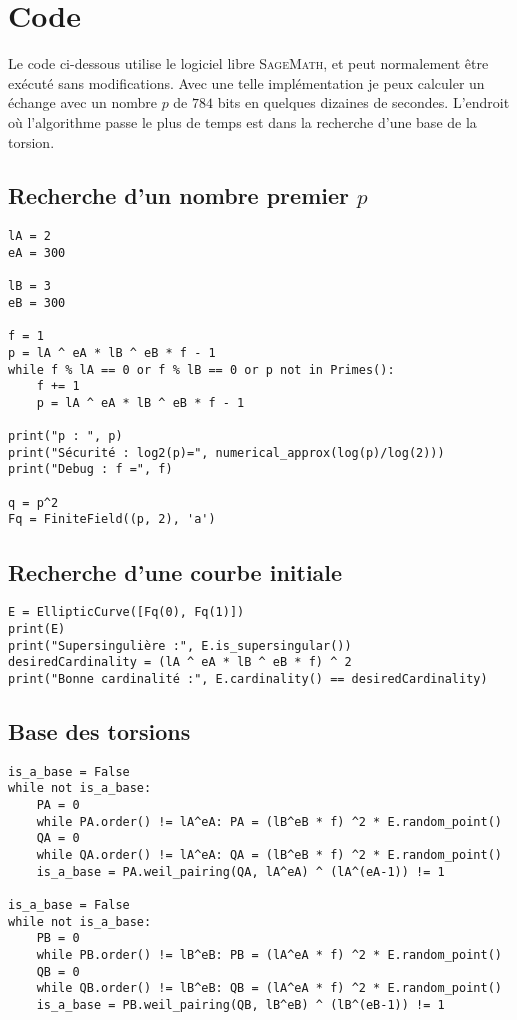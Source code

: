 \documentclass{article}
\theoremstyle{plain}%
\theoremstyle{definition}%
\begin{document}



\appendix

\section{Code}

Le code ci-dessous utilise le logiciel libre \textsc{SageMath}, et peut normalement être exécuté sans modifications. Avec une telle implémentation je peux calculer un échange avec un nombre $p$ de $784$ bits en quelques dizaines de secondes. L'endroit où l'algorithme passe le plus de temps est dans la recherche d'une base de la torsion. 

\subsection*{Recherche d'un nombre premier $p$}
\begin{verbatim}
lA = 2
eA = 300

lB = 3
eB = 300

f = 1
p = lA ^ eA * lB ^ eB * f - 1
while f % lA == 0 or f % lB == 0 or p not in Primes():
    f += 1 
    p = lA ^ eA * lB ^ eB * f - 1
    
print("p : ", p)
print("Sécurité : log2(p)=", numerical_approx(log(p)/log(2)))
print("Debug : f =", f)

q = p^2
Fq = FiniteField((p, 2), 'a')
\end{verbatim}

\subsection*{Recherche d'une courbe initiale}
\begin{verbatim}
E = EllipticCurve([Fq(0), Fq(1)])
print(E)
print("Supersingulière :", E.is_supersingular())
desiredCardinality = (lA ^ eA * lB ^ eB * f) ^ 2
print("Bonne cardinalité :", E.cardinality() == desiredCardinality)
\end{verbatim}

\subsection*{Base des torsions}
\begin{verbatim}
is_a_base = False
while not is_a_base:
    PA = 0
    while PA.order() != lA^eA: PA = (lB^eB * f) ^2 * E.random_point()
    QA = 0
    while QA.order() != lA^eA: QA = (lB^eB * f) ^2 * E.random_point()
    is_a_base = PA.weil_pairing(QA, lA^eA) ^ (lA^(eA-1)) != 1

is_a_base = False
while not is_a_base:
    PB = 0
    while PB.order() != lB^eB: PB = (lA^eA * f) ^2 * E.random_point()
    QB = 0
    while QB.order() != lB^eB: QB = (lA^eA * f) ^2 * E.random_point()
    is_a_base = PB.weil_pairing(QB, lB^eB) ^ (lB^(eB-1)) != 1
\end{verbatim}
\end{document}
